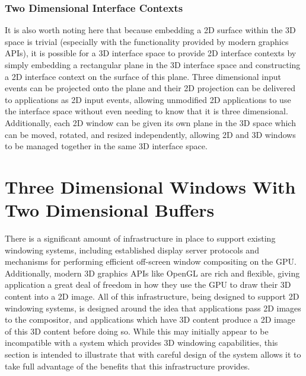 \subsubsection{Two Dimensional Interface Contexts}

It is also worth noting here that because embedding a 2D surface within the 3D space is trivial (especially with the functionality provided by modern graphics APIs), it is possible for a 3D interface space to provide 2D interface contexts by simply embedding a rectangular plane in the 3D interface space and constructing a 2D interface context on the surface of this plane. Three dimensional input events can be projected onto the plane and their 2D projection can be delivered to applications as 2D input events, allowing unmodified 2D applications to use the interface space without even needing to know that it is three dimensional. Additionally, each 2D window can be given its own plane in the 3D space which can be moved, rotated, and resized independently, allowing 2D and 3D windows to be managed together in the same 3D interface space.

\section{Three Dimensional Windows With Two Dimensional Buffers}
There is a significant amount of infrastructure in place to support existing windowing systems, including established display server protocols and mechanisms for performing efficient off-screen window compositing on the GPU. Additionally, modern 3D graphics APIs like OpenGL are rich and flexible, giving application a great deal of freedom in how they use the GPU to draw their 3D content into a 2D image. All of this infrastructure, being designed to support 2D windowing systems, is designed around the idea that applications pass 2D images to the compositor, and applications which have 3D content produce a 2D image of this 3D content before doing so. While this may initially appear to be incompatible with a system which provides 3D windowing capabilities, this section is intended to illustrate that with careful design of the system allows it to take full advantage of the benefits that this infrastructure provides.

